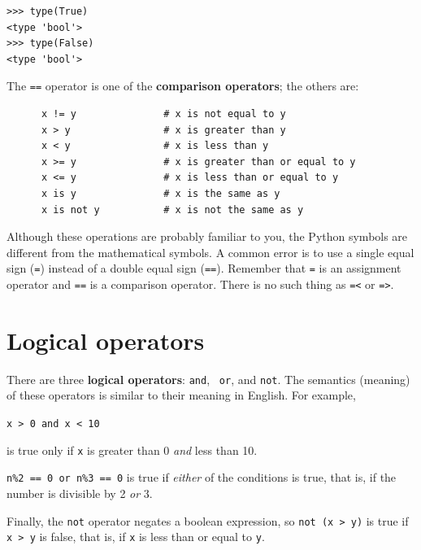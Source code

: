 \documentclass[10pt]{book}
\begin{document}

\beforeverb
\begin{verbatim}
>>> type(True)
<type 'bool'>
>>> type(False)
<type 'bool'>
\end{verbatim}
\afterverb
%
The {\tt ==} operator is one of the {\bf comparison operators}; the
others are:

\beforeverb
\begin{verbatim}
      x != y               # x is not equal to y
      x > y                # x is greater than y
      x < y                # x is less than y
      x >= y               # x is greater than or equal to y
      x <= y               # x is less than or equal to y
      x is y               # x is the same as y
      x is not y           # x is not the same as y
\end{verbatim}
\afterverb
%
Although these operations are probably familiar to you, the Python
symbols are different from the mathematical symbols.  A common error
is to use a single equal sign ({\tt =}) instead of a double equal sign
({\tt ==}).  Remember that {\tt =} is an assignment operator and
{\tt ==} is a comparison operator.   There is no such thing as
{\tt =<} or {\tt =>}.



\section {Logical operators}

There are three {\bf logical operators}: {\tt and}, {\tt
or}, and {\tt not}.  The semantics (meaning) of these operators is
similar to their meaning in English.  For example,

{\tt x > 0 and x < 10} 

is true only if {\tt x} is greater than 0
\emph{and} less than 10.


{\tt n\%2 == 0 or n\%3 == 0} is true if \emph{either} of the conditions
is true, that is, if the number is divisible by 2 \emph{or} 3.

Finally, the {\tt not} operator negates a boolean
expression, so {\tt not (x > y)} is true if {\tt x > y} is false,
that is, if {\tt x} is less than or equal to {\tt y}.
\end{document}
